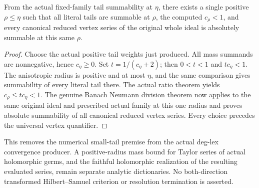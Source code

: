 \begin{theorem}
\label{hir:actual-deg-lex-vertex-small-radius}
\leanok
From the actual fixed-family tail summability at $\eta$, there exists a single positive $\rho\le\eta$ such that all literal tails are summable at $\rho$, the computed $c_\rho<1$, and every canonical reduced vertex series of the original whole ideal is absolutely summable at this same $\rho$.
\end{theorem}
\begin{proof}
Choose the actual positive tail weights just produced. All mass summands are nonnegative, hence $c_\eta\ge0$. Set $t=1/(c_\eta+2)$; then $0<t<1$ and $t c_\eta<1$. The anisotropic radius is positive and at most $\eta$, and the same comparison gives summability of every literal tail there. The actual ratio theorem yields $c_\rho\le t c_\eta<1$. The genuine Banach Neumann division theorem now applies to the same original ideal and prescribed actual family at this one radius and proves absolute summability of all canonical reduced vertex series. Every choice precedes the universal vertex quantifier.
\end{proof}

\begin{remark}
This removes the numerical small-tail premise from the actual deg-lex convergence producer. A positive-radius mass bound for Taylor series of actual holomorphic germs, and the faithful holomorphic realization of the resulting evaluated series, remain separate analytic dictionaries. No both-direction transformed Hilbert--Samuel criterion or resolution termination is asserted.
\end{remark}
